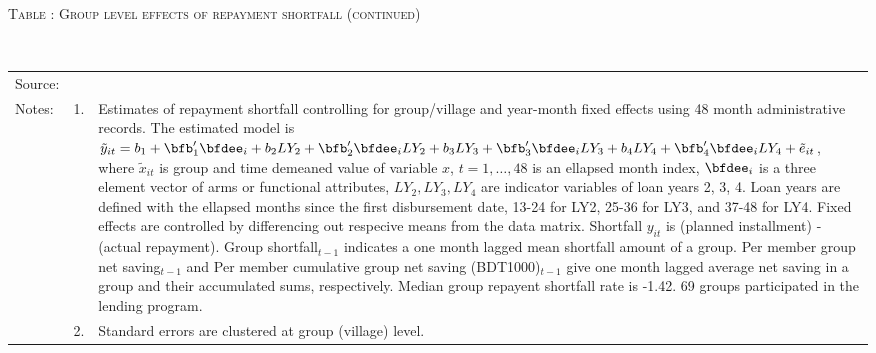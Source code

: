 \addtocounter{table}{-1}
\hspace{-1cm}\begin{minipage}[t]{14cm}
\hfil\textsc{\normalsize Table \thetable: Group level effects of repayment shortfall (continued)\label{tab shortfall group3}}\\
\setlength{\tabcolsep}{1pt}
\setlength{\baselineskip}{8pt}
\renewcommand{\arraystretch}{.6}
\hfil{}\\
\renewcommand{\arraystretch}{.8}
\setlength{\tabcolsep}{1pt}
\begin{tabular}{>{\hfill\scriptsize}p{1cm}<{}>{\hfill\scriptsize}p{.25cm}<{}>{\scriptsize}p{12cm}<{\hfill}}
Source:& \multicolumn{2}{l}{\scriptsize Estimated with GUK administrative data.}\\
Notes: & 1. & Estimates of repayment shortfall controlling for group/village and year-month fixed effects using 48 month administrative records. The estimated model is $\tilde{y}_{it}=b_{1}+\bfb'_{1}\bfdee_{i}+b_{2}LY_{2}+\bfb'_{2}\bfdee_{i}LY_{2}+b_{3}LY_{3}+\bfb'_{3}\bfdee_{i}LY_{3}+b_{4}LY_{4}+\bfb'_{4}\bfdee_{i}LY_{4}+\tilde{e}_{it}$, where $\tilde{x}_{it}$ is group and time demeaned value of variable $x$, $t=1,\dots, 48$ is an ellapsed month index, $\bfdee_{i}$ is a three element vector of arms or functional attributes, $LY_{2}, LY_{3}, LY_{4}$ are indicator variables of loan years 2, 3, 4. Loan years are defined with the ellapsed months since the first disbursement date, 13-24 for \textsf{LY2}, 25-36 for \textsf{LY3}, and 37-48 for \textsf{LY4}. Fixed effects are controlled by differencing out respecive means from the data matrix. Shortfall $y_{it}$ is (planned installment) - (actual repayment). \textsf{Group shortfall}$_{t-1}$ indicates a one month lagged mean shortfall amount of a group. \textsf{Per member group net saving}$_{t-1}$ and \textsf{Per member cumulative group net saving (BDT1000)}$_{t-1}$ give one month lagged average net saving in a group and their accumulated sums, respectively. Median group repayent shortfall rate is -1.42. 69 groups participated in the lending program. \\
& 2. & Standard errors are clustered at group (village) level.
\end{tabular}
\end{minipage}

